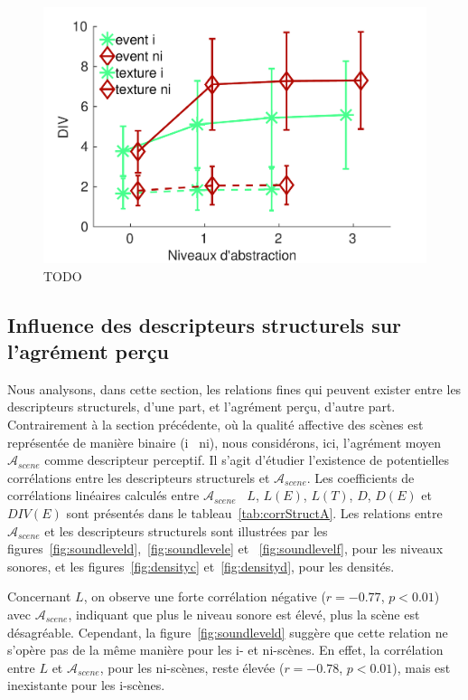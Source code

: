 \begin{figure}[t]
        \myfloatalign
        \includegraphics[width=.8\linewidth]{gfxXpUrbanSoundscape/xp1_div_1}
       \caption[TODO]{TODO}\label{fig:diversity}
\end{figure}

\subsection{Influence des descripteurs structurels sur l'agrément perçu}
\label{sec:ch5_corrDesStruct}

Nous analysons, dans cette section, les relations fines qui peuvent exister entre les descripteurs structurels, d'une part, et l'agrément perçu, d'autre part. Contrairement à la section précédente, où la qualité affective des scènes est représentée de manière binaire (i \vs~ni), nous considérons, ici, l'agrément moyen $\mathcal{A}_{scene}$ comme descripteur perceptif. Il s'agit d'étudier l'existence de potentielles corrélations entre les descripteurs structurels et $\mathcal{A}_{scene}$. Les coefficients de corrélations linéaires calculés entre $\mathcal{A}_{scene}$ \vs~$L$, $L(E)$, $L(T)$, $D$, $D(E)$ et $DIV(E)$ sont présentés dans le tableau~\ref{tab:corrStructA}. Les relations entre $\mathcal{A}_{scene}$ et les descripteurs structurels sont illustrées par les figures~\ref{fig:soundleveld},~\ref{fig:soundlevele} et ~\ref{fig:soundlevelf}, pour les niveaux sonores, et les figures~\ref{fig:densityc} et~\ref{fig:densityd}, pour les densités. 

Concernant $L$, on observe une forte corrélation négative ($r=-0.77$, $p<0.01$) avec $\mathcal{A}_{scene}$, indiquant que plus le niveau sonore est élevé, plus la scène est désagréable. Cependant, la figure~\ref{fig:soundleveld} suggère que cette relation ne s'opère pas de la même manière pour les i- et ni-scènes. En effet, la corrélation entre $L$ et $\mathcal{A}_{scene}$, pour les ni-scènes, reste élevée ($r=-0.78$, $p<0.01$), mais est inexistante pour les i-scènes. 

